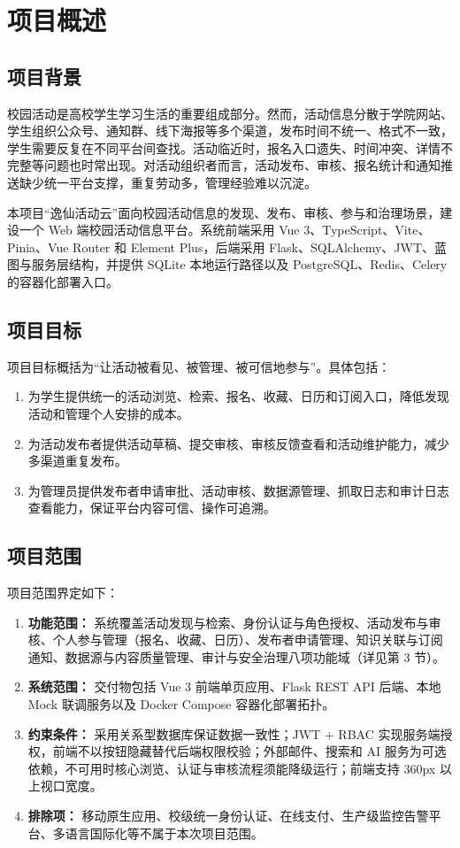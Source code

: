 \documentclass[12pt,a4paper]{ctexart}
\begin{document}
  \tableofcontents\clearpage{}

  \section{项目概述}
  \subsection{项目背景}
  校园活动是高校学生学习生活的重要组成部分。然而，活动信息分散于学院网站、学生组织公众号、通知群、线下海报等多个渠道，发布时间不统一、格式不一致，学生需要反复在不同平台间查找。活动临近时，报名入口遗失、时间冲突、详情不完整等问题也时常出现。对活动组织者而言，活动发布、审核、报名统计和通知推送缺少统一平台支撑，重复劳动多，管理经验难以沉淀。

  本项目“逸仙活动云”面向校园活动信息的发现、发布、审核、参与和治理场景，建设一个 Web 端校园活动信息平台。系统前端采用 Vue 3、TypeScript、Vite、Pinia、Vue Router 和 Element Plus，后端采用 Flask、SQLAlchemy、JWT、蓝图与服务层结构，并提供 SQLite 本地运行路径以及 PostgreSQL、Redis、Celery 的容器化部署入口。

  \subsection{项目目标}
  项目目标概括为“让活动被看见、被管理、被可信地参与”。具体包括：
  \begin{enumerate}
  \item 为学生提供统一的活动浏览、检索、报名、收藏、日历和订阅入口，降低发现活动和管理个人安排的成本。
  \item 为活动发布者提供活动草稿、提交审核、审核反馈查看和活动维护能力，减少多渠道重复发布。
  \item 为管理员提供发布者申请审批、活动审核、数据源管理、抓取日志和审计日志查看能力，保证平台内容可信、操作可追溯。
  \end{enumerate}

  \subsection{项目范围}
  项目范围界定如下：
  \begin{enumerate}
  \item \textbf{功能范围：} 系统覆盖活动发现与检索、身份认证与角色授权、活动发布与审核、个人参与管理（报名、收藏、日历）、发布者申请管理、知识关联与订阅通知、数据源与内容质量管理、审计与安全治理八项功能域（详见第 3 节）。
  \item \textbf{系统范围：} 交付物包括 Vue 3 前端单页应用、Flask REST API 后端、本地 Mock 联调服务以及 Docker Compose 容器化部署拓扑。
  \item \textbf{约束条件：} 采用关系型数据库保证数据一致性；JWT + RBAC 实现服务端授权，前端不以按钮隐藏替代后端权限校验；外部邮件、搜索和 AI 服务为可选依赖，不可用时核心浏览、认证与审核流程须能降级运行；前端支持 360px 以上视口宽度。
  \item \textbf{排除项：} 移动原生应用、校级统一身份认证、在线支付、生产级监控告警平台、多语言国际化等不属于本次项目范围。
  \end{enumerate}
\end{document}

